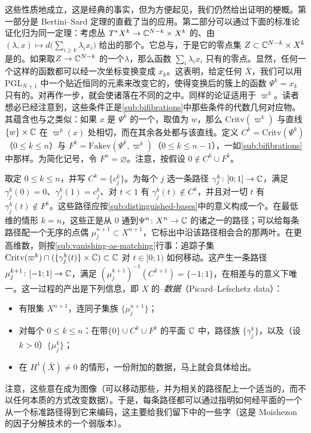 这些性质\trGeneric{}地成立，这是经典的事实，但为方便起见，我们仍然给出证明的梗概。第一部分是 Bertini--Sard 定理的直截了当的应用。第二部分可以通过下面的标准论证化归为同一定理：考虑\trPullback{}丛 $T^{*}X^k\to\mathbb{C}^{N-k}\times X^k$ 的、由 $(\lambda,x)\mapsto d\bigl(\sum_{i\ge k}\lambda_i x_i\bigr)$ 给出的那个\trSection。它总与\trZeroSection\trTransverse，于是它的零点集 $Z\subset\mathbb{C}^{N-k}\times X^k$ 是\trSmooth{}的。如果取\trProjection{}$Z\to\mathbb{C}^{N-k}$ 的一个\trRegularValue{}$\lambda$，那么函数 $\sum_i\lambda_i x_i$ 只有\trNondegenerate{}的零点。显然，任何一个这样的函数都可以经一次\trLinear{}坐标变换变成 $x_k$。这表明，给定任何 $\bar{X}$，我们可以用 $\mathrm{PGL}_{N+1}$ 中一个贴近恒同的元素来改变它的\trEmbedding，使得变换后的簇上的函数 $\Psi^k=x_k$ 只有\trNondegenerate{}的\trCriticalPoint。对\trEmbedding{}再作一步\trPerturbation，就会使诸\trCriticalPoint{}落在不同的\trFiber{}之中。同样的论证适用于 $\varpi^k$。读者想必已经注意到，这些条件正是\cref{sub:bifibrations}中那些条件的代数几何对应物。其蕴含也与之类似：如果 $x$ 是 $\Psi^k$ 的一个\trCriticalPoint，取值为 $w$，那么 $\mathrm{Critv}(\varpi^k)$ 与直线 $\{w\}\times\mathbb{C}$ 在 $\varpi^k(x)$ 处相切，而在其余各处都与该直线\trTransverse。定义 $C^k=\mathrm{Critv}(\Psi^k)$（$0\le k\le n$）与 $F^k=\mathrm{Fakev}(\Psi^k,\varpi^k)$（$0\le k\le n-1$），一如\cref{sub:bifibrations}中那样。为简化记号，令 $F^n=\varnothing$。注意，按假设 $0\notin C^k\cup F^k$。

取定 $0\le k\le n$，并写 $C^k=\{c^k_j\}$。为每个 $j$ 选一条\trEmbedding{}路径 $\gamma^k_j\colon[0;1]\to\mathbb{C}$，满足 $\gamma^k_j(0)=0$、$\gamma^k_j(1)=c^k_j$、对 $t<1$ 有 $\gamma^k_j(t)\notin C^k$，并且对一切 $t$ 有 $\gamma^k_j(t)\notin F^k$。这些路径应按\cref{sub:distinguished-bases}中的意义构成一个\trBasis。在最低维的情形 $k=n$，这些正是从 $0$ 通到\trBranchedCover{}$\Psi^n\colon X^n\to\mathbb{C}$ 的诸\trBranchPoint{}之一的路径；可以给每条路径配一个无序的点偶 $\mu^{n+1}_j\subset X^{n+1}$，它标出\trCovering{}中沿该路径相会合的那两叶。在更高维数，则按\cref{sub:vanishing-as-matching}行事：追踪子集 $\mathrm{Critv}(\varpi^k)\cap(\{\gamma^k_j(t)\}\times\mathbb{C})\subset\mathbb{C}$ 对 $t\in[0;1)$ 如何移动。这产生一条\trEmbedding{}路径 $\mu^{k+1}_j\colon[-1;1]\to\mathbb{C}$，满足 $(\mu^{k+1}_j)^{-1}(C^{k+1})=\{-1;1\}$，在相差\trIsotopy{}与\trOrientationReversing{}的意义下唯一。这一过程的产出是下列信息，即 $X$ 的\emph{\trPicard--\trLefschetz{}数据}（Picard--Lefschetz data）：
\begin{itemize}
\item 有限集 $X^{n+1}$，连同子集族 $\{\mu^{n+1}_j\}$；
\item 对每个 $0\le k\le n$：在带\trMarkedPoint{}$\{0\}\cup C^k\cup F^k$ 的平面 $\mathbb{C}$ 中，路径族 $\{\gamma^k_j\}$，以及（设 $k>0$）$\{\mu^k_j\}$；
\item 在 $H^1(\bar{X})\neq 0$ 的情形，一份附加的\trHomotopy{}数据，马上就会具体给出。
\end{itemize}
注意，这些意在成为\trTopology{}图像（可以移动那些\trMarkedPoint，并为相关的路径配上一个适当的\trIsotopy，而不以任何本质的方式改变数据）。于是，每条路径都可以通过指明如何经\trPunctured{}平面的一个\trDiffeomorphism{}从一个标准路径得到它来编码，这主要给我们留下\trBraidGroup{}中的一些字（这是 Moishezon 的\trBraid{}因子分解技术的一个弱版本）。

